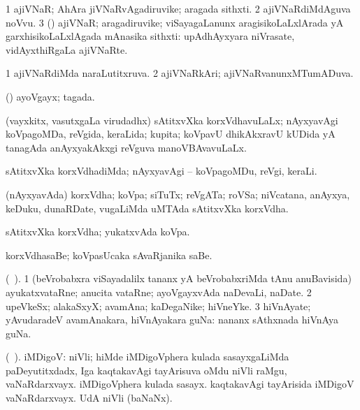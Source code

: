 \bentry
{}
\gl{\nA}
\bmng
\bnum
\num{1} ajiVNaR; AhAra jiVNaRvAgadiruvike; aragada sithxti. 
\num{2} ajiVNaRdiMdAguva noVvu. 
\num{3} (\rUpa) ajiVNaR; aragadiruvike; viSayagaLanunx aragisikoLaLxlArada yA garxhisikoLaLxlAgada mAnasika sithxti:  upAdhAyxyara niVrasate, vidAyxthiRgaLa ajiVNaRte. 
\enum
\emng
\eentry

\bentry
{}
\gl{\gu}
\bmng
\bnum
\num{1} ajiVNaRdiMda naraLutitxruva. 
\num{2} ajiVNaRkAri; ajiVNaRvanunxMTumADuva. 
\enum
\emng
\eentry

\bentry
{}
\gl{\gu}
\bmng
(\pArxparx) ayoVgayx; tagada. 
\emng
\eentry

\bentry
{}
\gl{\gu}
\bmng
(vayxkitx, vasutxgaLa virudadhx) sAtitxvXka korxVdhavuLaLx; nAyxyavAgi koVpagoMDa, reVgida, keraLida; kupita; koVpavU dhikAkxravU kUDida yA tanagAda anAyxyakAkxgi reVguva manoVBAvavuLaLx. 
\emng
\eentry

\bentry
{}
\gl{\kirxvi}
\bmng
sAtitxvXka korxVdhadiMda; nAyxyavAgi -- koVpagoMDu, reVgi, keraLi. 
\emng
\eentry

\bentry
{}
\gl{\nA}
\bmng
(nAyxyavAda) korxVdha; koVpa; siTuTx; reVgATa; roVSa; niVcatana, anAyxya, keDuku, dunaRDate, \mo vugaLiMda uMTAda sAtitxvXka korxVdha. 
\emng

\noindent
\gl{\pagu}
\bmng
{} sAtitxvXka korxVdha; yukatxvAda koVpa. 
\emng
\eentry

\bentry
{}
\gl{\nA}
\bmng
korxVdhasaBe; koVpasUcaka sAvaRjanika saBe. 
\emng
\eentry

\bentry
{}
\gl{\nA}
\bmng
(\bava\ ). 
\bnum
\num{1} (beVrobabxra viSayadalilx tananx yA beVrobabxriMda tAnu anuBavisida) ayukatxvataRne; anucita vataRne; ayoVgayxvAda naDevaLi, naDate. 
\num{2} upeVkeSx; alakaSxyX; avamAna; kaDegaNike; hiVneYke. 
\num{3} hiVnAyate; yAvudaradeV avamAnakara, hiVnAyakara guNa:  nananx sAthxnada hiVnAya guNa. 
\enum
\emng
\eentry

\bentry
{}
\gl{\nA}
\bmng
(\bava\ ). iMDigoV: 
\banum
{} niVli; hiMde iMDigoVphera kulada sasayxgaLiMda paDeyutitxdadx, Iga kaqtakavAgi tayArisuva oMdu niVli raMgu, vaNaRdarxvayx. 
 iMDigoVphera kulada sasayx. 
 kaqtakavAgi tayArisida iMDigoV vaNaRdarxvayx. 
\hypertarget{indigo(d)}{} 
 UdA niVli (baNaNx). 
\eanum
\emng
\eentry

